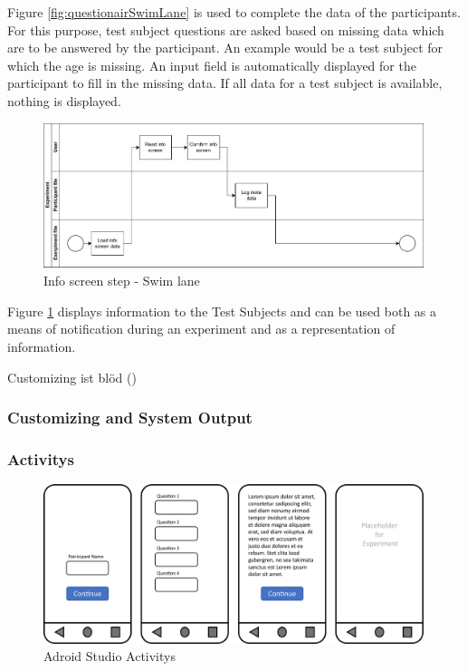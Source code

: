 Figure \ref{fig:questionairSwimLane} is used to complete the data of the participants. For this purpose, test subject questions are asked based on missing data which are to be answered by the participant. An example would be a test subject for which the age is missing. An input field is automatically displayed for the participant to fill in the missing data. If all data for a test subject is available, nothing is displayed.

\begin{figure}[htbp]
    \includegraphics[width=0.99\textwidth, keepaspectratio]{content/05_design_and_dev_artefacts/InfoScreenSwimLane.drawio.pdf}
    \caption{Info screen step - Swim lane}    
    \label{fig:infoScreenSwimLane}
\end{figure}

Figure \ref{fig:infoScreenSwimLane} displays information to the Test Subjects and can be used both as a means of notification during an experiment and as a representation of information.

Customizing ist blöd (\cite{Chou.2008})

\subsubsection{Customizing and System Output}

\subsubsection{Activitys}

\begin{figure}[htbp]
    \includegraphics[width=0.99\textwidth, keepaspectratio]{content/05_design_and_dev_artefacts/Activities.pdf}
    \caption{Adroid Studio Activitys}    
    \label{fig:activitiesMockUp}
\end{figure}

